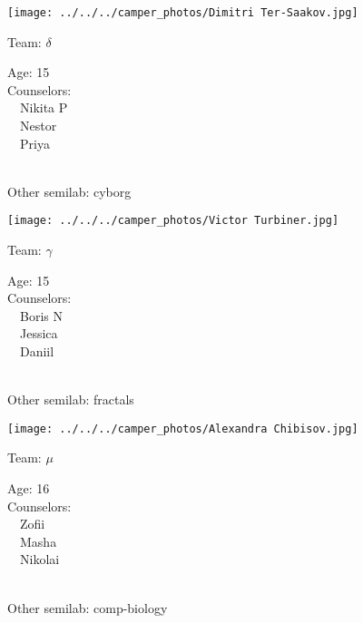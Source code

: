 \documentclass[10pt,letterpaper, landscape]{article}
\begin{document}
\horizontalshiftfornextsticker
\renewcommand{\baselinestretch}{1} \begin{sticker}
\noindent\begin{minipage}{0.5\textwidth}\texttt{[image: ../../../camper\_photos/Dimitri Ter-Saakov.jpg]}\end{minipage}\begin{minipage}{0.45\textwidth}
Team: {\Large $\delta$}

Age:        15\\
Counselors: \\\ \ Nikita P\\\ \ Nestor\\\ \ Priya\\
\end{minipage} \\ \vspace{0.07in}
Other semilab: cyborg
\end{sticker}
\verticalshiftfornextsticker
\renewcommand{\baselinestretch}{1} \begin{sticker}
\noindent\begin{minipage}{0.5\textwidth}\texttt{[image: ../../../camper\_photos/Victor Turbiner.jpg]}\end{minipage}\begin{minipage}{0.45\textwidth}
Team: {\Large $\gamma$}

Age:        15\\
Counselors: \\\ \ Boris N\\\ \ Jessica\\\ \ Daniil\\
\end{minipage} \\ \vspace{0.07in}
Other semilab: fractals
\end{sticker}
\horizontalshiftfornextsticker
\renewcommand{\baselinestretch}{1} \begin{sticker}
\noindent\begin{minipage}{0.5\textwidth}\texttt{[image: ../../../camper\_photos/Alexandra Chibisov.jpg]}\end{minipage}\begin{minipage}{0.45\textwidth}
Team: {\Large $\mu$}

Age:        16\\
Counselors: \\\ \ Zofii\\\ \ Masha\\\ \ Nikolai\\
\end{minipage} \\ \vspace{0.07in}
Other semilab: comp-biology
\end{sticker}
\end{document}
